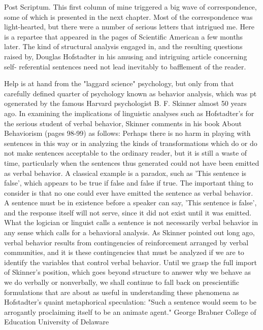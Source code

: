 Post Scriptum. This first column of mine triggered a big wave of correspondence, some of which is presented in the next chapter. Most of the correspondence was light-hearted, but there were a number of serious letters that intrigued me. Here is a repartee that appeared in the pages of Scientific American a few months later. 
The kind of structural analysis engaged in, and the resulting questions raised by, Douglas Hofstadter in his amusing and intriguing article concerning self- referential sentences need not lead inevitably to bafflement of the reader. 



Help is at hand from the "laggard science" psychology, but only from that carefully defined quarter of psychology known as behavior analysis, which was pt ogenerated by the famous Harvard psychologist B. F. Skinner almost 50 years ago. In examining the implications of linguistic analyses such as Hofstadter's for the serious student of verbal behavior, Skinner comments in his book About Behaviorism (pages 98-99) as follows: 
Perhaps there is no harm in playing with sentences in this way or in analyzing the kinds of transformations which do or do not make sentences acceptable to the ordinary reader, but it is still a waste of time, particularly when the sentences thus generated could not have been emitted as verbal behavior. A classical example is a paradox, such as 'This sentence is false', which appears to be true if false and false if true. The important thing to consider is that no one could ever have emitted the sentence as verbal behavior. A sentence must be in existence before a speaker can say, 'This sentence is false', and the response itself will not serve, since it did not exist until it was emitted. What the logician or linguist calls a sentence is not necessarily verbal behavior in any sense which calls for a behavioral analysis. 
As Skinner pointed out long ago, verbal behavior results from contingencies of reinforcement arranged by verbal communities, and it is these contingencies that must be analyzed if we are to identify the variables that control verbal behavior. Until we grasp the full import of Skinner's position, which goes beyond structure to answer why we behave as we do verbally or nonverbally, we shall continue to fall back on prescientific formulations that are about as useful in understanding these phenomena as Hofstadter's quaint metaphorical speculation: "Such a sentence would seem to be arrogantly proclaiming itself to be an animate agent." George Brabner College of Education University of Delaware 

